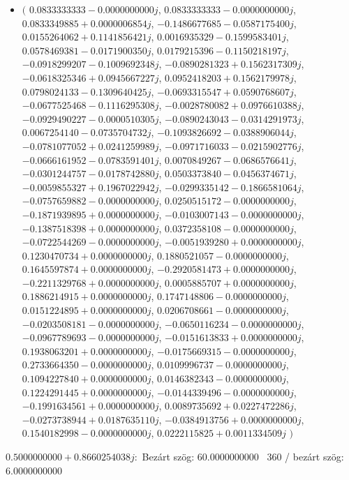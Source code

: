 \documentclass[14pt,a4paper]{article}
\begin{document}
\begin{itemize}
\item
$\big($
$0.0833333333-0.0000000000j$, $0.0833333333-0.0000000000j$, $0.0833349885+0.0000006854j$, $-0.1486677685-0.0587175400j$, $0.0155264062+0.1141856421j$, $0.0016935329-0.1599583401j$, $0.0578469381-0.0171900350j$, $0.0179215396-0.1150218197j$, $-0.0918299207-0.1009692348j$, $-0.0890281323+0.1562317309j$, $-0.0618325346+0.0945667227j$, $0.0952418203+0.1562179978j$, $0.0798024133-0.1309640425j$, $-0.0693315547+0.0590768607j$, $-0.0677525468-0.1116295308j$, $-0.0028780082+0.0976610388j$, $-0.0929490227-0.0000510305j$, $-0.0890243043-0.0314291973j$, $0.0067254140-0.0735704732j$, $-0.1093826692-0.0388906044j$, $-0.0781077052+0.0241259989j$, $-0.0971716033-0.0215902776j$, $-0.0666161952-0.0783591401j$, $0.0070849267-0.0686576641j$, $-0.0301244757-0.0178742880j$, $0.0503373840-0.0456374671j$, $-0.0059855327+0.1967022942j$, $-0.0299335142-0.1866581064j$, $-0.0757659882-0.0000000000j$, $0.0250515172-0.0000000000j$, $-0.1871939895+0.0000000000j$, $-0.0103007143-0.0000000000j$, $-0.1387518398+0.0000000000j$, $0.0372358108-0.0000000000j$, $-0.0722544269-0.0000000000j$, $-0.0051939280+0.0000000000j$, $0.1230470734+0.0000000000j$, $0.1880521057-0.0000000000j$, $0.1645597874+0.0000000000j$, $-0.2920581473+0.0000000000j$, $-0.2211329768+0.0000000000j$, $0.0005885707+0.0000000000j$, $0.1886214915+0.0000000000j$, $0.1747148806-0.0000000000j$, $0.0151224895+0.0000000000j$, $0.0206708661-0.0000000000j$, $-0.0203508181-0.0000000000j$, $-0.0650116234-0.0000000000j$, $-0.0967789693-0.0000000000j$, $-0.0151613833+0.0000000000j$, $0.1938063201+0.0000000000j$, $-0.0175669315-0.0000000000j$, $0.2733664350-0.0000000000j$, $0.0109996737-0.0000000000j$, $0.1094227840+0.0000000000j$, $0.0146382343-0.0000000000j$, $0.1224291445+0.0000000000j$, $-0.0144339496-0.0000000000j$, $-0.1991634561+0.0000000000j$, $0.0089735692+0.0227472286j$, $-0.0273738944+0.0187635110j$, $-0.0384913756+0.0000000000j$, $0.1540182998-0.0000000000j$, $0.0222115825+0.0011334509j$
$\big)$
\end{itemize}
$0.5000000000+0.8660254038j$:\
Bezárt szög: $60.0000000000$ \
360 / bezárt szög: $6.0000000000$\
\end{document}
